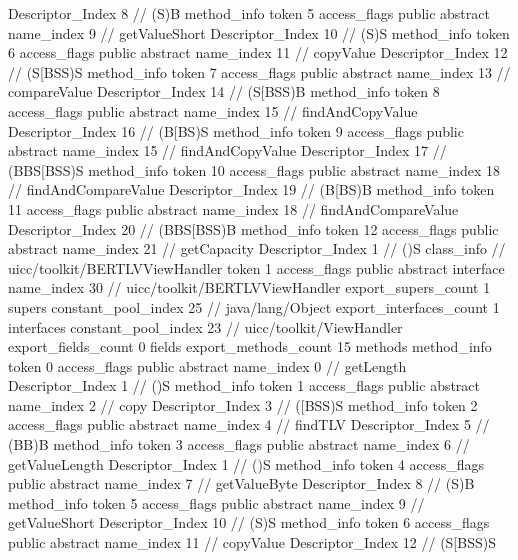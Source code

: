 {{{{{					Descriptor_Index	8		// (S)B
				}
				method_info {
					token	5
					access_flags	public abstract
					name_index	9		// getValueShort
					Descriptor_Index	10		// (S)S
				}
				method_info {
					token	6
					access_flags	public abstract
					name_index	11		// copyValue
					Descriptor_Index	12		// (S[BSS)S
				}
				method_info {
					token	7
					access_flags	public abstract
					name_index	13		// compareValue
					Descriptor_Index	14		// (S[BSS)B
				}
				method_info {
					token	8
					access_flags	public abstract
					name_index	15		// findAndCopyValue
					Descriptor_Index	16		// (B[BS)S
				}
				method_info {
					token	9
					access_flags	public abstract
					name_index	15		// findAndCopyValue
					Descriptor_Index	17		// (BBS[BSS)S
				}
				method_info {
					token	10
					access_flags	public abstract
					name_index	18		// findAndCompareValue
					Descriptor_Index	19		// (B[BS)B
				}
				method_info {
					token	11
					access_flags	public abstract
					name_index	18		// findAndCompareValue
					Descriptor_Index	20		// (BBS[BSS)B
				}
				method_info {
					token	12
					access_flags	public abstract
					name_index	21		// getCapacity
					Descriptor_Index	1		// ()S
				}
			}
		}
		class_info {		// uicc/toolkit/BERTLVViewHandler
			token	1
			access_flags	public abstract interface
			name_index	30		// uicc/toolkit/BERTLVViewHandler
			export_supers_count	1
			supers {
				constant_pool_index	25		// java/lang/Object
			}
			export_interfaces_count	1
			interfaces {
				constant_pool_index	23		// uicc/toolkit/ViewHandler
			}
			export_fields_count	0
			fields {
			}
			export_methods_count	15
			methods {
				method_info {
					token	0
					access_flags	public abstract
					name_index	0		// getLength
					Descriptor_Index	1		// ()S
				}
				method_info {
					token	1
					access_flags	public abstract
					name_index	2		// copy
					Descriptor_Index	3		// ([BSS)S
				}
				method_info {
					token	2
					access_flags	public abstract
					name_index	4		// findTLV
					Descriptor_Index	5		// (BB)B
				}
				method_info {
					token	3
					access_flags	public abstract
					name_index	6		// getValueLength
					Descriptor_Index	1		// ()S
				}
				method_info {
					token	4
					access_flags	public abstract
					name_index	7		// getValueByte
					Descriptor_Index	8		// (S)B
				}
				method_info {
					token	5
					access_flags	public abstract
					name_index	9		// getValueShort
					Descriptor_Index	10		// (S)S
				}
				method_info {
					token	6
					access_flags	public abstract
					name_index	11		// copyValue
					Descriptor_Index	12		// (S[BSS)S
}}}}}
